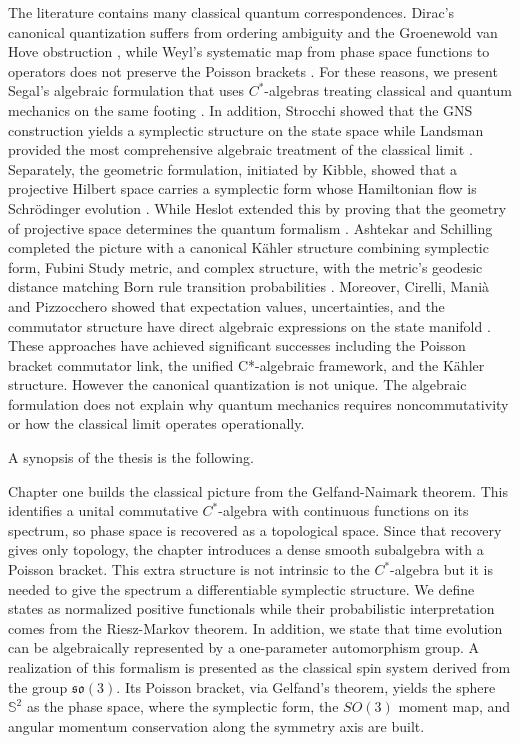 The literature contains many classical quantum correspondences. Dirac's canonical quantization suffers from ordering ambiguity and the Groenewold van Hove obstruction \cite{groenewoldPrinciplesElementaryQuantum1946}, while Weyl's systematic map from phase space functions to operators does not preserve the Poisson brackets \cite{weylTheoryGroupsQuantum2009}. For these reasons, we present Segal's algebraic formulation that uses $C^*$-algebras treating classical and quantum mechanics on the same footing \cite{segalIrreducibleRepresentationsOperator1947}. In addition, Strocchi showed that the GNS construction yields a symplectic structure on the state space \cite{strocchiComplexCoordinatesQuantum1966} while Landsman provided the most comprehensive algebraic treatment of the classical limit \cite{landsmanMathematicalTopicsClassical1998}. Separately, the geometric formulation, initiated by Kibble, showed that a projective Hilbert space carries a symplectic form whose Hamiltonian flow is Schr\"odinger evolution \cite{kibbleGeometrizationQuantumMechanics1979}. While Heslot extended this by proving that the geometry of projective space determines the quantum formalism \cite{heslotQuantumMechanicsClassical1985}. Ashtekar and Schilling completed the picture with a canonical Kähler structure combining symplectic form, Fubini Study metric, and complex structure, with the metric's geodesic distance matching Born rule transition probabilities \cite{ashtekarGeometricalFormulationQuantum1997}. Moreover, Cirelli, Manià and Pizzocchero showed that expectation values, uncertainties, and the commutator structure have direct algebraic expressions on the state manifold \cite{cirelliQuantumMechanicsInfinitedimensional1990}. These approaches have achieved significant successes including the Poisson bracket commutator link, the unified C*-algebraic framework, and the Kähler structure. However the canonical quantization is not unique. The algebraic formulation does not explain why quantum mechanics requires noncommutativity or how the classical limit operates operationally. 

\vspace{0.5cm}
\noindent A synopsis of the thesis is the following.

Chapter one builds the classical picture from the Gelfand-Naimark theorem. This identifies a unital commutative $C^*$-algebra with continuous functions on its spectrum, so phase space is recovered as a topological space. Since that recovery gives only topology, the chapter introduces a dense smooth subalgebra with a Poisson bracket. This extra structure is not intrinsic to the $C^*$-algebra but it is needed to give the spectrum a differentiable symplectic structure. We define states as normalized positive functionals while their probabilistic interpretation comes from the Riesz-Markov theorem. In addition, we state that time evolution can be algebraically represented by a one-parameter automorphism group. A realization of this formalism is presented as the classical spin system derived from the group $\mathfrak{so}(3)$. Its Poisson bracket, via Gelfand's theorem, yields the sphere $\mathbb{S}^2$ as the phase space, where the symplectic form, the $SO(3)$ moment map, and angular momentum conservation along the symmetry axis are built.

